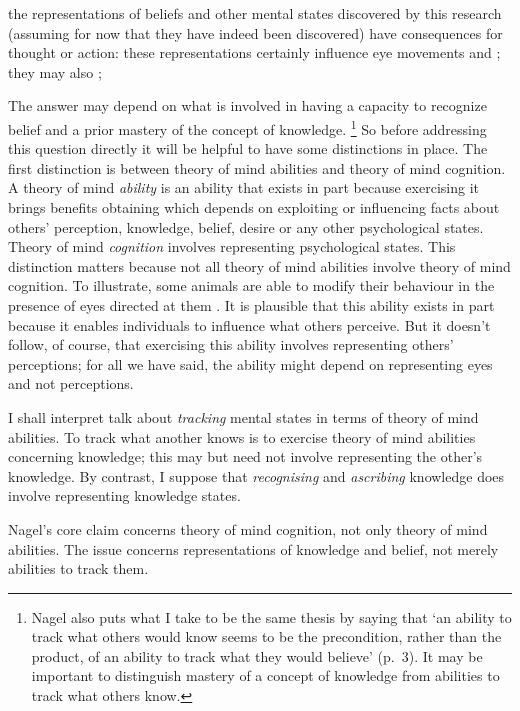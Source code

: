 \documentclass[11pt,a4paper]{extarticle}
\begin{document}
 
 

the representations of beliefs and other mental states discovered by this research (assuming for now that they have indeed been discovered) have consequences for thought or action:
these representations certainly influence eye movements \citep{Clements:1994cw} and  \citep{kovacs_social_2010}; they may also ; 






The answer may depend on what is involved in having a capacity  to recognize belief and a prior mastery of the concept of knowledge.%
\footnote{
Nagel also puts what I take to be the same thesis by saying that `an ability to track what others would know seems to be the precondition, rather than the product, of an ability to track what they would believe' (p.\ 3).
It may be important to distinguish mastery of a concept of knowledge from abilities to track what others know.
}
So before addressing this question directly it will be helpful to have some distinctions in place.
The first distinction is between theory of mind abilities and theory of mind cognition.
A theory of mind \textit{ability} is an ability that exists in part because exercising it brings benefits obtaining which depends on exploiting or influencing facts about others’ perception, knowledge, belief, desire or any other psychological states.  
Theory of mind \textit{cognition}  involves representing psychological states.
This distinction matters because not all theory of mind abilities involve theory of mind cognition.
To illustrate, some animals are able to modify their behaviour  in the presence of eyes directed at them \citep[e.g.][]{ernest-jones_effects_2011}.
It is plausible that this ability exists in part because it enables individuals to influence what others perceive.
But it doesn't follow, of course, that exercising this ability involves representing others' perceptions; for all we have said, the ability might depend on representing eyes and not perceptions.  



I shall interpret talk about \textit{tracking} mental states in terms of theory of mind abilities.
To track what another knows is to exercise theory of mind abilities concerning knowledge; this may but need not involve representing the other's knowledge.
By contrast, I suppose that \textit{recognising} and \textit{ascribing} knowledge does involve representing knowledge states.




Nagel's core claim concerns theory of mind cognition, not only theory of mind abilities. 
The issue concerns representations of knowledge and belief, not merely abilities to track them.%
\end{document}

